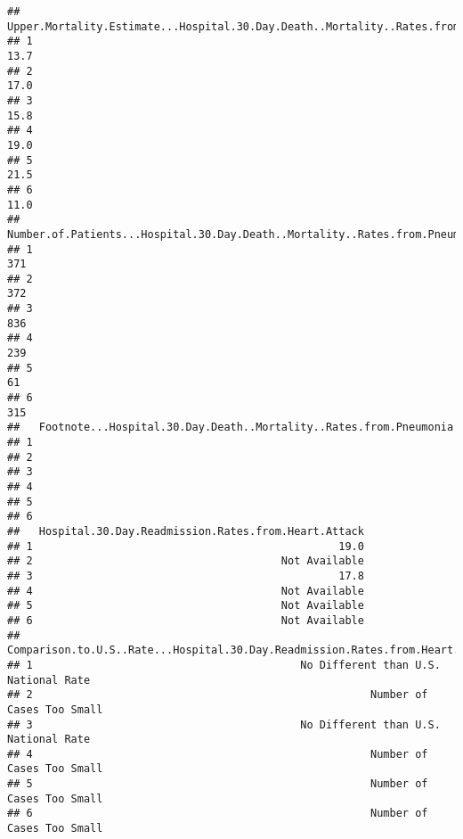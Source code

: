 \documentclass[
]{article}
\begin{document}
\begin{verbatim}
##   Upper.Mortality.Estimate...Hospital.30.Day.Death..Mortality..Rates.from.Pneumonia
## 1                                                                              13.7
## 2                                                                              17.0
## 3                                                                              15.8
## 4                                                                              19.0
## 5                                                                              21.5
## 6                                                                              11.0
##   Number.of.Patients...Hospital.30.Day.Death..Mortality..Rates.from.Pneumonia
## 1                                                                         371
## 2                                                                         372
## 3                                                                         836
## 4                                                                         239
## 5                                                                          61
## 6                                                                         315
##   Footnote...Hospital.30.Day.Death..Mortality..Rates.from.Pneumonia
## 1                                                                  
## 2                                                                  
## 3                                                                  
## 4                                                                  
## 5                                                                  
## 6                                                                  
##   Hospital.30.Day.Readmission.Rates.from.Heart.Attack
## 1                                                19.0
## 2                                       Not Available
## 3                                                17.8
## 4                                       Not Available
## 5                                       Not Available
## 6                                       Not Available
##   Comparison.to.U.S..Rate...Hospital.30.Day.Readmission.Rates.from.Heart.Attack
## 1                                          No Different than U.S. National Rate
## 2                                                     Number of Cases Too Small
## 3                                          No Different than U.S. National Rate
## 4                                                     Number of Cases Too Small
## 5                                                     Number of Cases Too Small
## 6                                                     Number of Cases Too Small

\end{verbatim}
\end{document}
